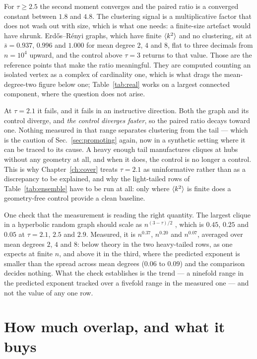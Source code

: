 For $\tau\ge2.5$ the second moment converges and the paired ratio is a converged
constant between $1.8$ and $4.8$. The clustering signal is a multiplicative
factor that does not wash out with size, which is what one needs: a finite-size
artefact would have shrunk. Erd\H{o}s--R\'enyi graphs, which have finite
$\langle k^{2} \rangle$ and no clustering, sit at $\bar s=0.937$, $0.996$ and $1.000$ for
mean degree $2$, $4$ and $8$, flat to three decimals from $n=10^{4}$ upward, and
the control above $\tau=3$ returns to that value. Those are the reference points
that make the ratio meaningful. They are computed counting an isolated vertex as
a complex of cardinality one, which is what drags the mean-degree-two figure
below one; Table~\ref{tab:real} works on a largest connected component, where
the question does not arise.

At $\tau=2.1$ it fails, and it fails in an instructive direction. Both the graph
and its control diverge, and \emph{the control diverges faster}, so the paired
ratio decays toward one. Nothing measured in that range separates clustering
from the tail --- which is the caution of Sec.~\ref{sec:promoting} again, now in
a synthetic setting where it can be traced to its cause. A heavy enough tail
manufactures cliques at hubs without any geometry at all, and when it does, the
control is no longer a control. This is why Chapter~\ref{ch:cover} treats
$\tau=2.1$ as uninformative rather than as a discrepancy to be explained, and
why the light-tailed rows of Table~\ref{tab:ensemble} have to be run at all:
only where $\langle k^{2} \rangle$ is finite does a geometry-free control provide a clean
baseline.

One check that the measurement is reading the right quantity. The largest
clique in a hyperbolic random graph should scale as $n^{(3-\tau)/2}$
\citep{friedrich2015}, which is $0.45$, $0.25$ and $0.05$ at $\tau=2.1$, $2.5$
and $2.9$. Measured, it is $n^{0.37}$, $n^{0.20}$ and $n^{0.07}$, averaged over
mean degrees $2$, $4$ and $8$: below theory in the two heavy-tailed rows, as one
expects at finite $n$, and above it in the third, where the predicted exponent
is smaller than the spread across mean degrees ($0.06$ to $0.09$) and the
comparison decides nothing. What the check establishes is the trend --- a
ninefold range in the predicted exponent tracked over a fivefold range in the
measured one --- and not the value of any one row.

\section{How much overlap, and what it buys}
\label{sec:overlap-data}

